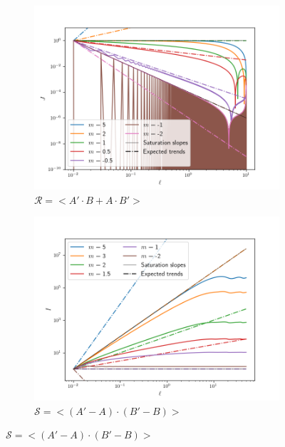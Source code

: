 \begin{figure}
\center
     \begin{subfigure}[b]{0.496\textwidth}
         \centering
         \includegraphics[width=\textwidth,trim = 0.5cm 0.5cm 2cm 2cm, clip]{./Part_Appendix/images/sat_cor}
         \caption{$\mathcal{R} = <A'\cdot B + A\cdot B'>$ }
         \label{fig:sat_corr}
     \end{subfigure}
     \hfill
     \begin{subfigure}[b]{0.496\textwidth}
         \centering
         \includegraphics[width=\textwidth,trim = 0.5cm 0.5cm 2cm 2cm, clip]{./Part_Appendix/images/sat_inc}
         \caption{$\mathcal{S}=<\left(A'-A\right)\cdot\left(B'-B\right)>$ }
         \label{fig:sat_inc}

\end{subfigure}
\end{figure}
